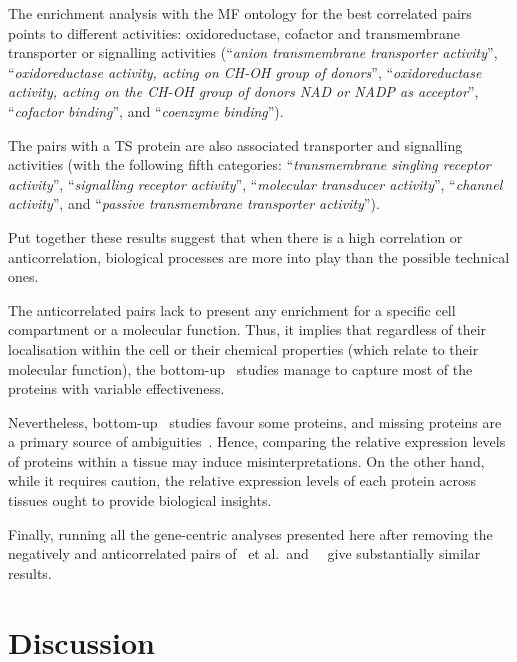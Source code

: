 The enrichment analysis with the MF ontology
for the best correlated pairs points to different activities:
oxidoreductase, cofactor and transmembrane transporter or signalling activities
(\enquote{\textit{anion transmembrane transporter activity}},
\enquote{\textit{oxidoreductase activity, acting on CH-OH group of donors}},
\enquote{\textit{oxidoreductase activity, acting on the CH-OH group of donors
NAD or NADP as acceptor}},
\enquote{\textit{cofactor binding}},
and \enquote{\textit{coenzyme binding}}).

The pairs with a \gls{TS} protein are also associated
transporter and signalling activities
(with the following fifth categories:
\enquote{\textit{transmembrane singling receptor activity}},
\enquote{\textit{signalling receptor activity}},
\enquote{\textit{molecular transducer activity}},
\enquote{\textit{channel activity}},
and \enquote{\textit{passive transmembrane transporter activity}}).

Put together these results suggest that
when there is a high correlation or anticorrelation,
biological processes are more into play than the possible technical ones.

The anticorrelated pairs lack to present any enrichment
for a specific cell compartment or a molecular function.
Thus, it implies that
regardless of their localisation within the cell
or their chemical properties (which relate to their molecular function),
the bottom-up \ms\ studies manage to capture most of the proteins
with variable effectiveness.

Nevertheless, bottom-up \ms\ studies favour some proteins,
and missing proteins are a primary source of ambiguities~.
Hence, comparing the relative expression levels of proteins within a tissue
may induce misinterpretations.
On the other hand, while it requires caution,
the relative expression levels of each protein across tissues
ought to provide biological insights.

Finally, running all the gene-centric analyses presented here
after removing the negatively and anticorrelated pairs of \uhlen\ et al.\ and
\gtex\ \mRNAs\ give substantially similar results.

\section{Discussion}

